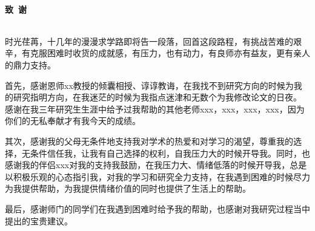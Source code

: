 \documentclass[a4paper, zihao=-4, twoside, fontset=fandol]{ctexart}
\begin{document}
{
    \newpage

    {
        \centering
        \heiti
        \textbf{\\ 致\ 谢 \\\mbox{}\\ }
        \par %
    }
    

    {
        \raggedright
        \fangsong{}
        
        \quad\quad 时光荏苒，十几年的漫漫求学路即将告一段落，回首这段路程，有挑战苦难的艰辛，有克服困难时收货的成就感，有压力，也有动力，有良师亦有益友，更有亲人的鼎力支持。
    
        \quad\quad 首先，感谢恩师xx教授的倾囊相授、谆谆教诲，在我找不到研究方向的时候为我的研究指明方向，在我迷茫的时候为我指点迷津和无数个为我修改论文的日夜。
        感谢在我三年研究生生涯中给予过我帮助的其他老师xxx，xxx，xxx，xxx，因为你们的无私奉献才有我今天的成绩。

        \quad\quad 其次，感谢我的父母无条件地支持我对学术的热爱和对学习的渴望，尊重我的选择，无条件信任我，让我有自己选择的权利，自我压力大的时候开导我。同时，也感谢我的伴侣xxx对我的支持我鼓励，在我压力大、情绪低落的时候开导我，总是以积极乐观的心态指引我，对我的学习和研究全力支持，在我遇到困难的时候尽力为我提供帮助，为我提供情绪价值的同时也提供了生活上的帮助。
    
        \quad\quad 最后，感谢师门的同学们在我遇到困难时给予我的帮助，也感谢对我研究过程当中提出的宝贵建议。
        
        \par %
    }

}
\end{document}
